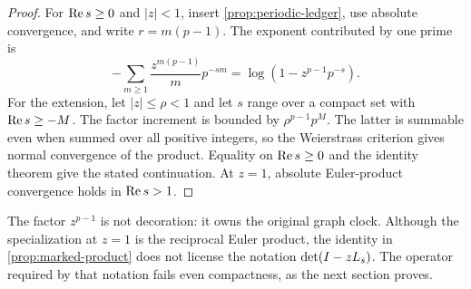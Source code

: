 \begin{proof}
For $\operatorname{Re} s\geq0$ and $|z|<1$, insert
\cref{prop:periodic-ledger}, use absolute convergence, and write
$r=m(p-1)$.  The exponent contributed by one prime is
\[
 -\sum_{m\geq1}\frac{z^{m(p-1)}}{m}p^{-sm}
 =\log\left(1-z^{p-1}p^{-s}\right).
\]
For the extension, let $|z|\leq\rho<1$ and let $s$ range over a compact set
with $\operatorname{Re} s\geq-M$.  The
factor increment is bounded by $\rho^{p-1}p^M$.  The latter is summable even
when summed over all positive integers, so the Weierstrass criterion gives
normal convergence of the product.  Equality on $\operatorname{Re} s\geq0$ and the
identity theorem give the stated continuation.  At $z=1$, absolute
Euler-product convergence holds in $\operatorname{Re} s>1$.
\end{proof}

The factor $z^{p-1}$ is not decoration: it owns the original graph clock.
Although the specialization at $z=1$ is the reciprocal Euler product, the
identity in \cref{prop:marked-product} does not license the notation
$\det(I-zL_s)$.  The operator required by that notation fails even
compactness, as the next section proves.
